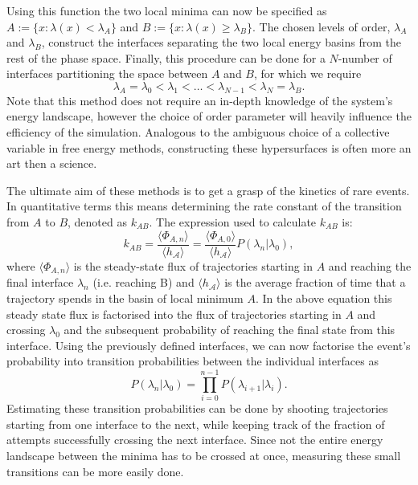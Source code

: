 Using this function the two local minima can
now be specified as $A := \{x: \lambda(x) < \lambda_A\} $ and $B := \{x: \lambda(x) \geq
\lambda_B\} $. The chosen levels of order, $\lambda_A$ and $\lambda_B$, construct the
interfaces separating the two local energy basins from the rest of the
phase space. Finally, this procedure can be done for a $N$-number of interfaces
partitioning the space between $A$ and  $B$, for which we require
\begin{equation}
\lambda_A = \lambda_0 < \lambda_1< \dots < \lambda_{N-1} < \lambda_N = \lambda_B.
\end{equation}
Note that this method does not require an in-depth knowledge of the system's energy
landscape, however the choice of order parameter will heavily influence the
efficiency of the simulation. Analogous to the ambiguous choice of a collective variable
in free energy methods, constructing these hypersurfaces is often more an art then a
science.

The ultimate aim of these methods is to get a grasp of the kinetics of rare events. In
quantitative terms this means determining the rate constant of the transition
from $A$ to  $B$, denoted as $k_{AB}$. The expression used to calculate $k_{AB}$ is:
 \begin{equation}
    k_{AB} = \frac{\langle \Phi_{A,n} \rangle}{\langle h_{\mathcal{A}}\rangle} =
    \frac{\langle \Phi_{A,0} \rangle}{\langle h_{\mathcal{A}}\rangle}
    P(\lambda_n|\lambda_0),
 \end{equation}
 where $\langle \Phi_{A,n} \rangle$ is the steady-state flux of trajectories starting in
 $A$ and reaching the final interface $\lambda_n$ (i.e. reaching B) and
$\langle h_{\mathcal{A}}\rangle$ is the average fraction of time that  a trajectory
spends in the basin of local minimum $A$. In the above equation this steady state flux is
factorised into the flux of trajectories starting in $A$ and crossing $\lambda_0$ and the
subsequent probability of reaching the final state from this
interface. Using the previously defined interfaces, we can now factorise the event's
probability into transition probabilities between the individual interfaces as
\begin{equation}
    P(\lambda_n|\lambda_0) = \prod_{i=0}^{n-1} P(\lambda_{i+1}|\lambda_i).
 \end{equation}
Estimating these transition probabilities can be done by shooting trajectories starting
from one interface to the next, while keeping track of the fraction of attempts
successfully crossing the next interface. Since not the entire energy landscape between
the minima has to be crossed at once, measuring these small transitions can be more
easily done.

